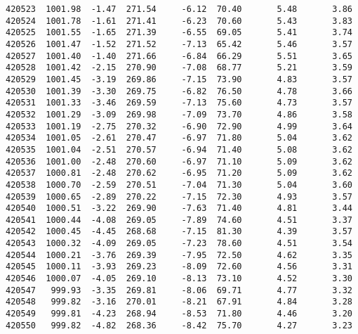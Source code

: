 \documentclass[11pt]{article}
\begin{document}
\begin{Verbatim}[commandchars=\\\{\}]
420523  1001.98  -1.47  271.54     -6.12  70.40       5.48       3.86   
420524  1001.78  -1.61  271.41     -6.23  70.60       5.43       3.83   
420525  1001.55  -1.65  271.39     -6.55  69.05       5.41       3.74   
420526  1001.47  -1.52  271.52     -7.13  65.42       5.46       3.57   
420527  1001.40  -1.40  271.66     -6.84  66.29       5.51       3.65   
420528  1001.42  -2.15  270.90     -7.08  68.77       5.21       3.59   
420529  1001.45  -3.19  269.86     -7.15  73.90       4.83       3.57   
420530  1001.39  -3.30  269.75     -6.82  76.50       4.78       3.66   
420531  1001.33  -3.46  269.59     -7.13  75.60       4.73       3.57   
420532  1001.29  -3.09  269.98     -7.09  73.70       4.86       3.58   
420533  1001.19  -2.75  270.32     -6.90  72.90       4.99       3.64   
420534  1001.05  -2.61  270.47     -6.97  71.80       5.04       3.62   
420535  1001.04  -2.51  270.57     -6.94  71.40       5.08       3.62   
420536  1001.00  -2.48  270.60     -6.97  71.10       5.09       3.62   
420537  1000.81  -2.48  270.62     -6.95  71.20       5.09       3.62   
420538  1000.70  -2.59  270.51     -7.04  71.30       5.04       3.60   
420539  1000.65  -2.89  270.22     -7.15  72.30       4.93       3.57   
420540  1000.51  -3.22  269.90     -7.63  71.40       4.81       3.44   
420541  1000.44  -4.08  269.05     -7.89  74.60       4.51       3.37   
420542  1000.45  -4.45  268.68     -7.15  81.30       4.39       3.57   
420543  1000.32  -4.09  269.05     -7.23  78.60       4.51       3.54   
420544  1000.21  -3.76  269.39     -7.95  72.50       4.62       3.35   
420545  1000.11  -3.93  269.23     -8.09  72.60       4.56       3.31   
420546  1000.07  -4.05  269.10     -8.13  73.10       4.52       3.30   
420547   999.93  -3.35  269.81     -8.06  69.71       4.77       3.32   
420548   999.82  -3.16  270.01     -8.21  67.91       4.84       3.28   
420549   999.81  -4.23  268.94     -8.53  71.80       4.46       3.20   
420550   999.82  -4.82  268.36     -8.42  75.70       4.27       3.23   


\end{Verbatim}
\end{document}
